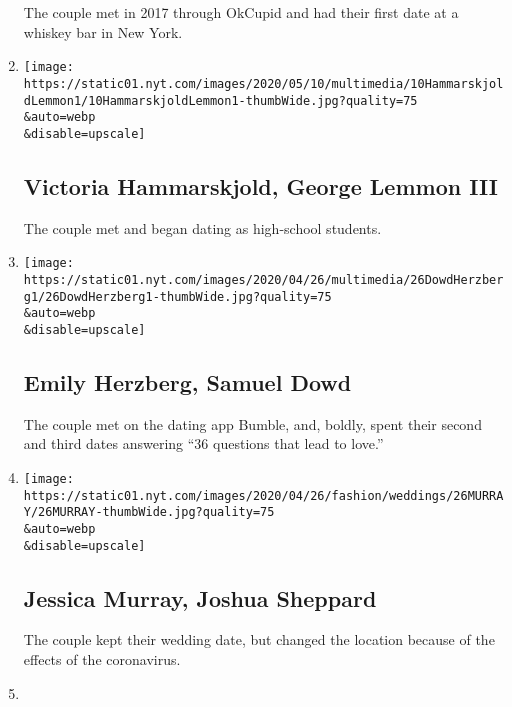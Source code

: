 \begin{enumerate}
  The couple met in 2017 through OkCupid and had their first date at a
  whiskey bar in New York.
\item
  \href{/2020/05/10/fashion/weddings/victoria-hammarskjold-george-lemmon-iii.html}{}

  \texttt{[image: https://static01.nyt.com/images/2020/05/10/multimedia/10HammarskjoldLemmon1/10HammarskjoldLemmon1-thumbWide.jpg?quality=75\\\&auto=webp\\\&disable=upscale]}

  \hypertarget{victoria-hammarskjold-george-lemmon-iii}{%
  \subsection{Victoria Hammarskjold, George Lemmon
  III}\label{victoria-hammarskjold-george-lemmon-iii}}

  The couple met and began dating as high-school students.
\item
  \href{/2020/04/26/fashion/weddings/emily-herzberg-samuel-dowd.html}{}

  \texttt{[image: https://static01.nyt.com/images/2020/04/26/multimedia/26DowdHerzberg1/26DowdHerzberg1-thumbWide.jpg?quality=75\\\&auto=webp\\\&disable=upscale]}

  \hypertarget{emily-herzberg-samuel-dowd}{%
  \subsection{Emily Herzberg, Samuel
  Dowd}\label{emily-herzberg-samuel-dowd}}

  The couple met on the dating app Bumble, and, boldly, spent their
  second and third dates answering ``36 questions that lead to love.''
\item
  \href{/2020/04/26/fashion/weddings/jessica-murray-joshua-sheppard.html}{}

  \texttt{[image: https://static01.nyt.com/images/2020/04/26/fashion/weddings/26MURRAY/26MURRAY-thumbWide.jpg?quality=75\\\&auto=webp\\\&disable=upscale]}

  \hypertarget{jessica-murray-joshua-sheppard}{%
  \subsection{Jessica Murray, Joshua
  Sheppard}\label{jessica-murray-joshua-sheppard}}

  The couple kept their wedding date, but changed the location because
  of the effects of the coronavirus.
\item
  \href{/2020/04/05/fashion/weddings/larissa-garbade-jacob-yosafat.html}{}


\end{enumerate}
